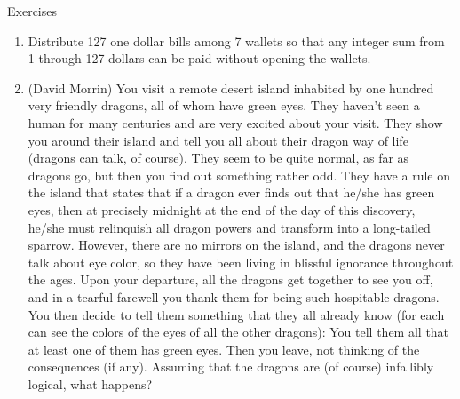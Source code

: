 \begin{xcb}{Exercises}
\begin{enumerate}
\begin{hint}
\end{hint}
\item {}Distribute 127 one dollar bills among 7 wallets so that any integer sum from 1 through 127 dollars can be paid without opening the wallets.
\begin{hint}
\end{hint}
\item (David Morrin) You visit a remote desert island inhabited by one hundred very friendly dragons, all of whom have green eyes. They haven’t seen a human for many centuries and are very excited about your visit. They show you around their island and tell you all about their dragon way of life (dragons can talk, of course). They seem to be quite normal, as far as dragons go, but then you find out something rather odd. They have a rule on the island that states that if a dragon ever finds out that he/she has green eyes, then at precisely midnight at the end of the day of this discovery, he/she must relinquish all dragon powers and transform into a long-tailed sparrow. However, there are no mirrors on the island, and the dragons never talk about eye color, so they have been living in blissful ignorance throughout the ages. Upon your departure, all the dragons get together to see you off, and in a tearful farewell you thank them for being such hospitable dragons. You then decide to tell them something that they all already know (for each can see the colors of the eyes of all the other dragons): You tell them all that at least one of them has green eyes. Then you leave, not thinking of the consequences (if any). Assuming that the dragons are (of course) infallibly logical, what happens?
\begin{hint}
\end{hint}


\end{enumerate}
\end{xcb}
